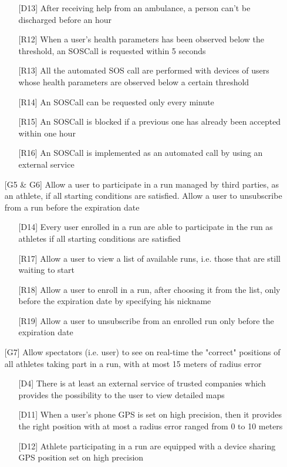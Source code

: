 \begin{itemize}
\begin{itemize}
	\item[{[D13]}] After receiving help from an ambulance, a person can't be discharged before an hour
	\item[{[R12]}] When a user's health parameters has been observed below the threshold, an SOSCall is requested within 5 seconds
	\item[{[R13]}] All the automated SOS call are performed with devices of users whose health parameters are observed below a certain threshold
	\item[{[R14]}] An SOSCall can be requested only every minute
	\item[{[R15]}] An SOSCall is blocked if a previous one has already been accepted within one hour
	\item[{[R16]}] An SOSCall is implemented as an automated call by using an external service
	\end{itemize}
\item[{[G5 \& G6]}] Allow a user to participate in a run managed by third parties, as an athlete, if all starting conditions are satisfied. Allow a user to unsubscribe from a run before the expiration date
	\begin{itemize}
	\item[{[D14]}] Every user enrolled in a run are able to participate in the run as athletes if all starting conditions are satisfied
	\item[{[R17]}] Allow a user to view a list of available runs, i.e. those that are still waiting to start 
	\item[{[R18]}] Allow a user to enroll in a run, after choosing it from the list, only before the expiration date by specifying his nickname
	\item[{[R19]}] Allow a user to unsubscribe from an enrolled run only before the expiration date
	\end{itemize}
\item[{[G7]}] Allow spectators (i.e. user) to see on real-time the "correct" positions of all athletes taking part in a run, with at most 15 meters of radius error
	\begin{itemize}
	\item[{[D4]}] There is at least an external service of trusted companies which provides the possibility to the user to view detailed maps
	\item[{[D11]}] When a user's phone GPS is set on high precision, then it provides the right position with at most a radius error ranged from 0 to 10 meters
	\item[{[D12]}] Athlete participating in a run are equipped with a device sharing GPS position set on high precision

\end{itemize}
\end{itemize}

